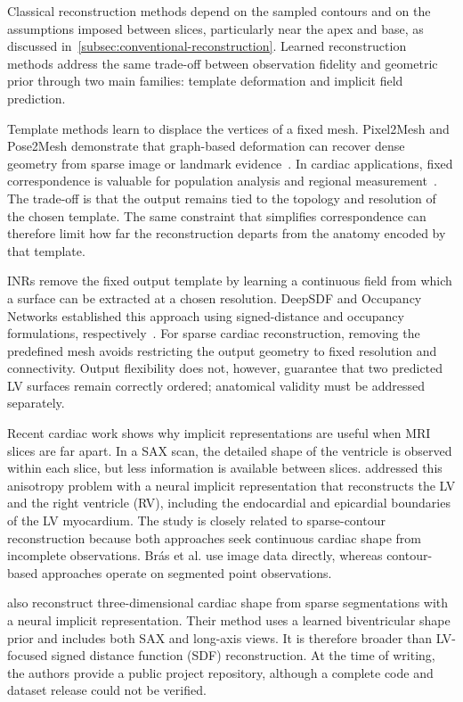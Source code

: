 \noindent
Classical reconstruction methods depend on the sampled contours and on the
assumptions imposed between slices, particularly near the apex and base, as
discussed in~\cref{subsec:conventional-reconstruction}. Learned reconstruction methods
address the same trade-off between observation fidelity and geometric prior
through two main families: template deformation and implicit field prediction.

Template methods learn to displace the vertices of a fixed mesh. Pixel2Mesh and
Pose2Mesh demonstrate that graph-based deformation can recover dense geometry
from sparse image or landmark evidence~\parencite{wang2018pixel2mesh,choi2020pose2mesh}. In cardiac applications,
fixed correspondence is valuable for population analysis and regional measurement~\parencite{bai2015biventricularatlas,suinesiaputra2014collaborative,beetz2021cardiacshape}.
The trade-off is that the output remains tied to the topology and resolution of
the chosen template. The same constraint that simplifies correspondence can
therefore limit how far the reconstruction departs from the anatomy encoded by
that template.

INRs remove the fixed output template by
learning a continuous field from which a surface can be extracted at a chosen
resolution. DeepSDF and Occupancy Networks established this approach using
signed-distance and occupancy formulations, respectively~\parencite{deepsdf2019,occupancynetworks2019}. For sparse cardiac reconstruction,
removing the predefined mesh avoids restricting the output geometry to fixed
resolution and connectivity. Output flexibility does not, however, guarantee
that two predicted LV surfaces remain correctly ordered; anatomical validity
must be addressed separately.

Recent cardiac work shows why implicit representations are useful when MRI
slices are far apart. In a SAX scan, the detailed shape of the ventricle is
observed within each slice, but less information is available between slices.
\textcite{bras2026anisotropy} addressed this anisotropy problem with a neural
implicit representation that reconstructs the LV and the right ventricle (RV),
including the endocardial and epicardial boundaries of the LV myocardium. The
study is closely related to sparse-contour reconstruction because both
approaches seek continuous cardiac shape from incomplete observations.
Br\'as et al. use image data directly, whereas contour-based approaches
operate on segmented point observations.

\textcite{muffoletto2025nihc} also reconstruct three-dimensional cardiac shape
from sparse segmentations with a neural implicit representation. Their method
uses a learned biventricular shape prior and includes both SAX and long-axis
views. It is therefore broader than LV-focused signed distance function (SDF) reconstruction. At the time
of writing, the authors provide a public project repository, although a complete
code and dataset release could not be verified.

